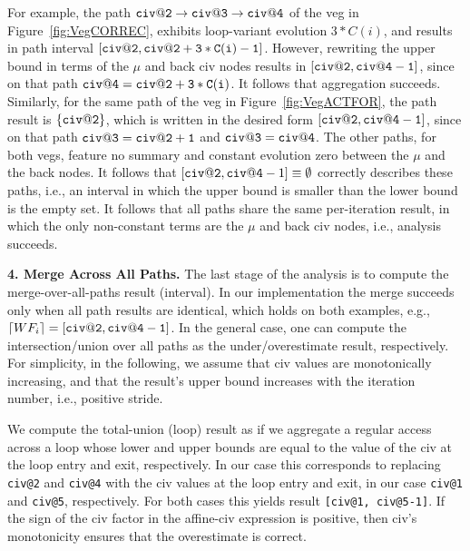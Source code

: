 \documentclass{sig-alternate}
\begin{document}
For example, the path ${\tt civ@2}\rightarrow{\tt civ@3}\rightarrow{\tt civ@4}$ 
of the {\sc veg} in Figure~\ref{fig:VegCORREC}, exhibits loop-variant evolution 
$3*C(i)$, and results in path interval 
$[{\tt civ@2},{\tt civ@2+3*C(i)-1}]$. However, rewriting the upper bound in terms
of the $\mu$ and back {\sc civ} nodes results in $[{\tt civ@2},{\tt civ@4-1}]$, 
since on that path ${\tt civ@4}={\tt civ@2+3*C(i)}$. 
It follows that aggregation succeeds.
%
Similarly, for the same path of the {\sc veg} in  Figure~\ref{fig:VegACTFOR}, the
path result is $\{{\tt civ@2}\}$, which is written in the desired form
 $[{\tt civ@2}, {\tt civ@4-1}]$, since on that path 
${\tt civ@3}={\tt civ@2+1}$
and ${\tt civ@3}={\tt civ@4}$.
%
The other paths, for both {\sc veg}s, feature no summary and constant evolution zero 
between the $\mu$ and the back nodes. It follows that 
$[{\tt civ@2},{\tt civ@4}-1] \equiv \emptyset$ correctly describes these paths, 
i.e., an interval in which the upper bound is smaller than the lower bound is the empty set.
  It follows that all paths share the same per-iteration result, in which the only 
non-constant terms are the $\mu$ and back {\sc civ} nodes, i.e., analysis succeeds.


\vspace{1ex}

{\bf 4. Merge Across All Paths.} 
%
The last stage of the analysis is to compute the merge-over-all-paths result (interval).
In our implementation the merge succeeds only when all path results are 
identical, which holds on both examples, e.g., $\lceil WF_i \rceil = {\tt [civ@2,civ@4-1]}$.
In the general case, one can compute the intersection/union over all paths as the  
under/overestimate result, respectively.
For simplicity, in the following, we assume that {\sc civ} values are monotonically 
increasing, and that the result's upper bound increases with the iteration number,
i.e., positive stride. 


We compute the total-union (loop) result as if we aggregate a regular access
across a loop whose lower and upper bounds are equal to the value of the 
{\sc civ} at the loop entry and exit, respectively.  
%
In our case this corresponds to replacing {\tt civ@2} and {\tt civ@4} 
with the {\sc civ} values at the loop entry and exit, in our case 
{\tt civ@1} and {\tt civ@5}, respectively. 
For both cases this yields result
{\tt [civ@1, civ@5-1]}.   If the sign of the {\sc civ} factor in
the affine-{\sc civ} expression is positive, then {\sc civ}'s
monotonicity ensures that the overestimate is correct. 
\end{document}

